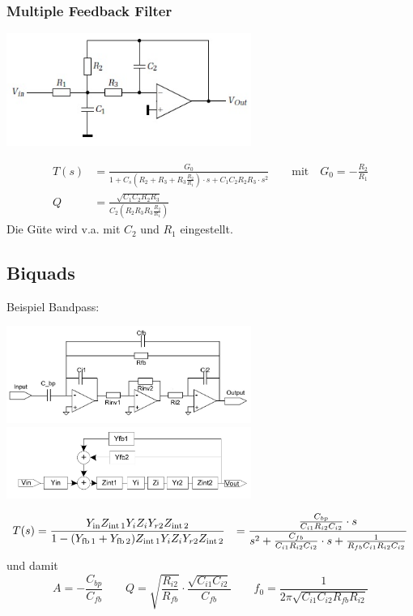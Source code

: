 \subsubsection{Multiple Feedback Filter}
\begin{center}
	\includegraphics[width=8cm]{images/filter_mfb.jpg}
\end{center}
\begin{align*}
	T(s) &= \frac{G_0}{1 + C_s \left(R_2 + R_3 + R_3 \frac{R_2}{R_1}\right) \cdot s + C_1 C_2 R_2 R_3 \cdot s^2} \qquad \text{mit} \quad G_0 = -\frac{R_2}{R_1} \\
	Q &= \frac{\sqrt{C_1 C_2 R_2 R_3}}{C_2 \left(R_2 R_3 R_3 \frac{R_2}{R_1}\right)}
\end{align*}
Die Güte wird v.a. mit $C_2$ und $R_1$ eingestellt.


\subsection{Biquads}
Beispiel Bandpass:
\begin{center}
	\includegraphics[width=8cm]{images/filter_biquad.jpg} 
	\hspace{2cm}
	\includegraphics[width=8cm]{images/filter_biquad_block.jpg} 
\end{center}
\begin{align*}
	T(s) &= \frac{Y_{\operatorname{\text{in}}} Z_{\operatorname{\text{int}} 1} Y_i Z_i Y_{r 2} Z_{\operatorname{\text{int}} 2}}{1 - (Y_{\operatorname{\text{fb}} 1}+Y_{\operatorname{\text{fb}} 2}) Z_{\operatorname{\text{int}} 1} Y_i Z_i Y_{r 2} Z_{\operatorname{\text{int}} 2}}
	&= \frac{\frac{C_{bp}}{C_{i1} R_{i2} C_{i2}} \cdot s}{s^2 + \frac{C_{fb}}{C_{i1} R_{i2} C_{i2}} \cdot s + \frac{1}{R_{fb} C_{i1} R_{i2} C_{i2}}}
\end{align*}
und damit
\begin{equation*}
	A = -\frac{C_{bp}}{C_{fb}} \qquad Q = \sqrt{\frac{R_{i2}}{R_{fb}}} \cdot \frac{\sqrt{C_{i1} C_{i2}}}{C_{fb}} \qquad f_0 = \frac{1}{2 \pi \sqrt{C_{i1} C_{i2} R_{fb} R_{i2}}}
\end{equation*}

